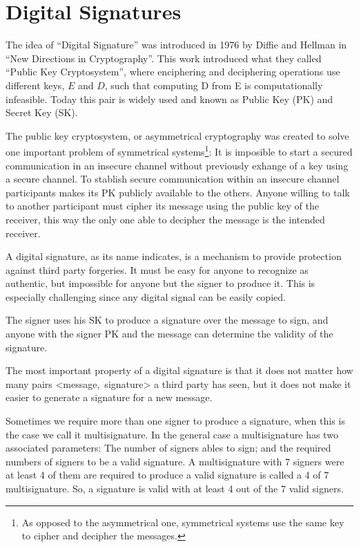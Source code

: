 \section{Digital Signatures}
The idea of ``Digital Signature'' was introduced in 1976 by Diffie and
  Hellman in ``New Directions in Cryptography''\cite{diffie1976new}. This work
  introduced what they called ``Public Key Cryptosystem'', where enciphering and
  deciphering operations use different keys, $E$ and $D$, such that computing D
  from E is computationally infeasible.
Today this pair is widely used and known as Public Key (PK) and Secret Key (SK).

The public key cryptosystem, or asymmetrical cryptography was created to solve
  one important problem of symmetrical systems\footnote{As opposed to the
  asymmetrical one, symmetrical systems use the same key to cipher and decipher
  the messages.}: It is imposible to start a secured communication in an
  insecure channel without previously exhange of a key using a secure channel.
To stablish secure communication within an insecure channel participants makes
  its PK publicly available to the others.
Anyone willing to talk to another participant must cipher its message using the
  public key of the receiver, this way the only one able to decipher the message
  is the intended receiver.

A digital signature, as its name indicates, is a mechanism to provide protection
  against third party forgeries. It must be easy for anyone to recognize as
  authentic, but impossible for anyone but the signer to produce it. This is
  especially challenging since any digital signal can be easily copied.

The signer uses his SK to produce a signature over the message to sign, and
  anyone with the signer PK and the message can determine the validity of the
  signature.

The most important property of a digital signature is that it does not matter how
  many pairs \mbox{\textless message, signature\textgreater} a third party has
  seen, but it does not make it easier to generate a signature for a new
  message.

Sometimes we require more than one signer to produce a signature, when this is
  the case we call it multisignature.
In the general case a multisignature has two associated parameters: The number
  of signers ables to sign; and the required numbers of signers to be a valid
  signature.
A multisignature with 7 signers were at least 4 of them are required to produce
  a valid signature is called a 4 of 7 multisignature.
So, a signature is valid with at least 4 out of the 7 valid signers.
